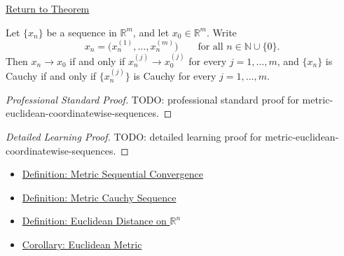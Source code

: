 \newpage
{}
\label{prf:metric-euclidean-coordinatewise-sequences}

\begin{remark*}[Return]
\hyperref[thm:metric-euclidean-coordinatewise-sequences]{Return to Theorem}
\end{remark*}

\begin{theorem*}
Let \(\{x_n\}\) be a sequence in \(\mathbb{R}^m\), and let
\(x_0\in\mathbb{R}^m\).  Write
\[
  x_n=\bigl(x_n^{(1)},\ldots,x_n^{(m)}\bigr)
  \qquad\text{for all } n\in\mathbb{N}\cup\{0\}.
\]
Then \(x_n\to x_0\) if and only if \(x_n^{(j)}\to x_0^{(j)}\) for every
\(j=1,\ldots,m\), and \(\{x_n\}\) is Cauchy if and only if
\(\{x_n^{(j)}\}\) is Cauchy for every \(j=1,\ldots,m\).
\end{theorem*}

\begin{proof}[Professional Standard Proof]
\LRAProofBodyStart
TODO: professional standard proof for metric-euclidean-coordinatewise-sequences.
\end{proof}

\begin{proof}[Detailed Learning Proof]
\LRAProofBodyStart
TODO: detailed learning proof for metric-euclidean-coordinatewise-sequences.
\end{proof}

\begin{remark*}
\end{remark*}

\begin{dependencies}
\begin{itemize}
  \item \hyperref[def:metric-sequential-convergence]{Definition: Metric Sequential Convergence}
  \item \hyperref[def:metric-cauchy-sequence]{Definition: Metric Cauchy Sequence}
  \item \hyperref[def:euclidean-distance-rn]{Definition: Euclidean Distance on \(\mathbb{R}^n\)}
  \item \hyperref[cor:euclidean-metric]{Corollary: Euclidean Metric}
\end{itemize}
\end{dependencies}

\clearpage

